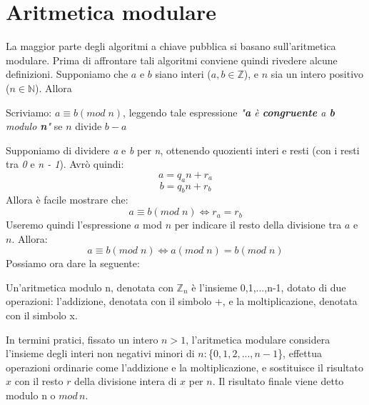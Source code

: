 \section{Aritmetica modulare}
La maggior parte degli algoritmi a chiave pubblica si basano sull'aritmetica modulare. Prima di affrontare tali algoritmi conviene quindi rivedere alcune definizioni.
\newline \newline
Supponiamo che $a$ e $b$ siano interi ($a,b \in \mathbb{Z}$), e $n$ sia un intero positivo ($n \in \mathbb{N}$). Allora 
\begin{defin}
Scriviamo: $a \equiv b(mod \; n)$, leggendo tale espressione \textit{"\textbf{a} è \textbf{congruente} a \textbf{b} modulo \textbf{n}"} se $n$ divide $b-a$
\end{defin}
Supponiamo di dividere \textit{a} e \textit{b} per \textit{n}, ottenendo quozienti interi e resti (con i resti tra \textit{0} e \textit{n - 1}). Avrò quindi:
\begin{equation}
a = q_a n + r_a
\end{equation}
\begin{equation}
b = q_b n + r_b
\end{equation}
Allora è facile mostrare che:
\begin{equation}
a \equiv b(mod \; n) \Leftrightarrow r_a = r_b
\end{equation}
Useremo quindi l'espressione $a$ mod $n$ per indicare il resto della divisione tra $a$ e $n$. Allora:
\begin{equation}
a \equiv b(mod \; n) \Leftrightarrow a(mod \; n) = b(mod \; n)
\end{equation}
Possiamo ora dare la seguente:
\begin{defin}
Un'aritmetica modulo n, denotata con $\mathbb{Z}_n$ è l'insieme {0,1,...,n-1}, dotato di due operazioni: l'addizione, denotata con il simbolo +, e la moltiplicazione, denotata con il simbolo x.
\end{defin}
In termini pratici, fissato un intero $ n>1 $, l'aritmetica modulare considera l'insieme degli interi non negativi minori di $n: $\{$0, 1, 2,..., n-1$\}, effettua operazioni ordinarie come l'addizione e la moltiplicazione, e sostituisce il risultato $x$ con il resto $r$ della divisione intera di $x$ per $n$. Il risultato finale viene detto modulo n o $mod \, n$. \\

